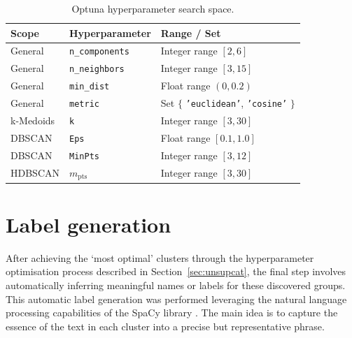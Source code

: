 \documentclass[10pt,oneside]{report}
\begin{document}
\begin{table}[htbp]
    \fontsize{8}{11}\selectfont %
    \centering
    \renewcommand{\arraystretch}{1.2} %
    \begin{tabularx}{\textwidth}{l l X}
        \toprule %
        \textbf{Scope} & \textbf{Hyperparameter} & \textbf{Range / Set} \\ %
        \midrule %
        General       & \texttt{n\_components} & Integer range $[2, 6]$ \\
        General       & \texttt{n\_neighbors}  & Integer range $[3, 15]$ \\
        General       & \texttt{min\_dist}     & Float range $(0, 0.2)$ \\
        General       & \texttt{metric}        & Set $\{$ \texttt{'euclidean'}, \texttt{'cosine'} $\}$ \\
        k-Medoids     & \texttt{k}             & Integer range $[3, 30]$ \\
        DBSCAN        & \texttt{Eps}           & Float range $[0.1, 1.0]$ \\
        DBSCAN        & \texttt{MinPts}        & Integer range $[3, 12]$ \\
        HDBSCAN       & $m_{\text{pts}}$       & Integer range $[3, 30]$ \\
        \bottomrule %
    \end{tabularx}
    \renewcommand{\arraystretch}{1.0} %
    \caption{Optuna hyperparameter search space.} %
    \label{tab:hypreal}
\end{table}

\section{Label generation}\label{sec:labelgen}

After achieving the `most optimal’ clusters through the hyperparameter optimisation process described in Section~\ref{sec:unsupcat}, the final step involves automatically inferring meaningful names or labels for these discovered groups. This automatic label generation was performed leveraging the natural language processing capabilities of the SpaCy library \cite{spacy2}. The main idea is to capture the essence of the text in each cluster into a precise but representative phrase.
\end{document}
